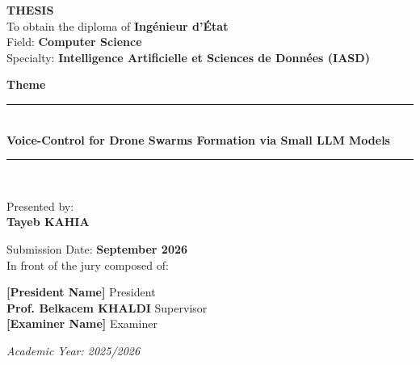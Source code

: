 \begin{titlepage}


\vspace{0.5cm}
{\Large \textbf{THESIS}}\\

\vspace{0.4cm}
{\large To obtain the diploma of \textbf{Ingénieur d'État}\\}
{\large Field: \textbf{Computer Science}\\}
{\large Specialty: \textbf{Intelligence Artificielle et Sciences de Données (IASD)}\\}

\vspace{0.4cm}
{\Large \textbf{Theme}}\\
\rule{15cm}{0.2mm}\\
\vspace{0.4cm}
{\textbf{\large Voice-Control for Drone Swarms Formation via Small LLM Models}}\\
\rule{15cm}{0.2mm}\\
\vspace{0.2cm}

{\large Presented by:}\\
\vspace{0.2cm}
{\large \textbf{Tayeb KAHIA}}

\vspace{0.4cm}
{\large Submission Date: \textbf{September 2026}\\
In front of the jury composed of:}
\vspace{0.2cm}
\begin{center}
    {\large \textbf{[President Name]} \hfill President\\}
    {\large \textbf{Prof. Belkacem KHALDI} \hfill Supervisor\\}
    {\large \textbf{[Examiner Name]} \hfill Examiner\\}
\end{center}

\vspace{0.5cm}
{\normalsize \textit{Academic Year: 2025/2026}}
\end{titlepage}
